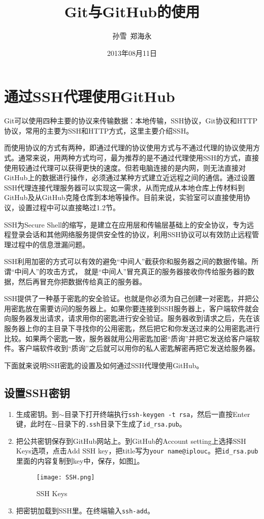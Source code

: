 \documentclass[a4paper,12pt]{article}
\author{孙雪\ 郑海永}  %
\title{Git与GitHub的使用} %
\date{2013年08月11日}
\begin{document}

\maketitle
\tableofcontents
\newpage
\section{通过SSH代理使用GitHub}

Git可以使用四种主要的协议来传输数据：本地传输，SSH协议，Git协议和HTTP协议，常用的主要为SSH和HTTP方式，这里主要介绍SSH。

而使用协议的方式有两种，即通过代理的协议使用方式与不通过代理的协议使用方式。通常来说，用两种方式均可，最为推荐的是不通过代理使用SSH的方式，直接使用较通过代理可以获得更快的速度。但若电脑连接的是内网，则无法直接对GitHub上的数据进行操作，必须通过某种方式建立近远程之间的通信。通过设置SSH代理连接代理服务器可以实现这一需求，从而完成从本地仓库上传材料到GitHub及从GitHub克隆仓库到本地等操作。目前来说，实验室可以直接使用协议，设置过程中可以直接略过1.2节。

SSH为Secure Shell的缩写，是建立在应用层和传输层基础上的安全协议，专为远程登录会话和其他网络服务提供安全性的协议，利用SSH协议可以有效防止远程管理过程中的信息泄漏问题。

SSH利用加密的方式可以有效的避免“中间人”截获你和服务器之间的数据传输。所谓“中间人”的攻击方式， 就是“中间人”冒充真正的服务器接收你传给服务器的数据，然后再冒充你把数据传给真正的服务器。

SSH提供了一种基于密匙的安全验证。也就是你必须为自己创建一对密匙，并把公用密匙放在需要访问的服务器上。如果你要连接到SSH服务器上，客户端软件就会向服务器发出请求，请求用你的密匙进行安全验证。服务器收到请求之后，先在该服务器上你的主目录下寻找你的公用密匙，然后把它和你发送过来的公用密匙进行比较。如果两个密匙一致，服务器就用公用密匙加密“质询”并把它发送给客户端软件。客户端软件收到“质询”之后就可以用你的私人密匙解密再把它发送给服务器。

下面就来说明SSH密匙的设置及如何通过SSH代理使用GitHub。

\subsection{设置SSH密钥}

\begin{enumerate}
\item 生成密钥。到$\sim$目录下打开终端执行\lstinline|ssh-keygen -t rsa|，然后一直按Enter键，此时在$\sim$目录下的\verb|.ssh|目录下生成了\verb|id_rsa.pub|。
\item 把公共密钥保存到GitHub网站上。到GitHub的Account setting上选择SSH Keys选项，点击Add SSH key，把title写为\verb|your name@iplouc|。把\verb|id_rsa.pub|里面的内容复制到key中，保存，如图\ref{fig:2}。
\begin{figure}[!htb] %
\centering
\texttt{[image: SSH.png]}
\caption{SSH Keys}\label{fig:2}
\end{figure}
\item 把密钥加载到SSH里。在终端输入\lstinline|ssh-add|。
\end{enumerate}
\end{document}
